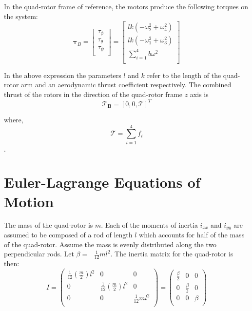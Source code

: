 In the quad-rotor frame of reference, the motors produce the following torques on the system:\\
\begin{equation}
    \label{taub}
    \boldsymbol \tau_B = \left[ \begin{array}{c} \tau_{\phi}\\\tau_{\theta}\\\tau_{\psi}\\ \end{array} \right] = \left[ \begin{array}{c} l k (-\omega_2^2 + \omega_4^2)\\l k (-\omega_1^2 + \omega_3^2)\\ \displaystyle \sum \limits_{i=1}^4 b \omega^2\\\end{array} \right]
\end{equation}

In the above expression the parameters $l$ and $k$ refer to the length of the quad-rotor arm and an aerodynamic thrust coefficient respectively. The combined thrust of the rotors in the direction of the quad-rotor frame $z$ axis is\\
\begin{equation}
\boldsymbol{\mathcal{T}_B} = [0, 0, \mathcal{T}]^T
\end{equation}

where,\\
\begin{equation}
    \label{totalThrust}
    \mathcal{T}=  \displaystyle \sum \limits_{i=1}^4 f_i
\end{equation}.



\section{Euler-Lagrange Equations of Motion}


\noindent
The mass of the quad-rotor is $m$. Each of the moments of inertia  $ i_{xx} $  and $ i_{yy} $
are assumed to be composed of a rod of length $ l $   which accounts for half of the mass of the quad-rotor. Assume the mass
is evenly distributed along the two perpendicular rods. Let  \(\beta  =\text{  }\frac{1}{12}m l^2 \). The inertia matrix for the quad-rotor is then: \\
\begin{equation}
I = \left(
\begin{array}{ccc}
 \frac{1}{12}\left(\frac{m}{2}\right)l^2 & 0 & 0 \\
 0 & \frac{1}{12}\left(\frac{m}{2}\right)l^2 & 0 \\
 0 & 0 & \frac{1}{12}m l^2 \\
\end{array}
\right) = \left(
\begin{array}{ccc}
 \frac{\beta }{2} & 0 & 0 \\
 0 & \frac{\beta }{2} & 0 \\
 0 & 0 & \beta  \\
\end{array}
\right)
\end{equation}

